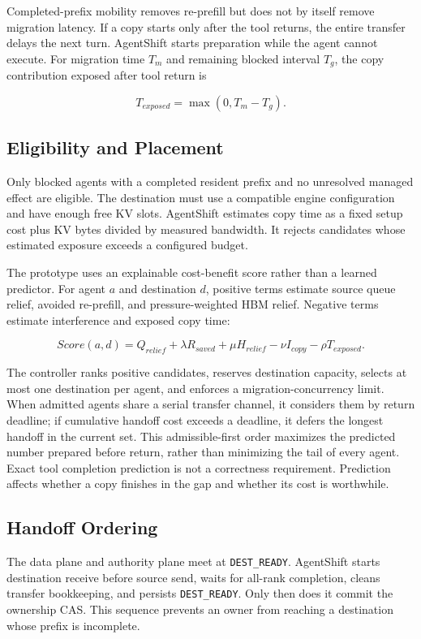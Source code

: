 Completed-prefix mobility removes re-prefill but does not by itself remove migration latency. If a copy starts only after the tool returns, the entire transfer delays the next turn. AgentShift starts preparation while the agent cannot execute. For migration time \(T_m\) and remaining blocked interval \(T_g\), the copy contribution exposed after tool return is

\[
T_{exposed}=\max(0,T_m-T_g).
\]

\subsection{Eligibility and Placement}\label{eligibility-and-placement}

Only blocked agents with a completed resident prefix and no unresolved managed effect are eligible. The destination must use a compatible engine configuration and have enough free KV slots. AgentShift estimates copy time as a fixed setup cost plus KV bytes divided by measured bandwidth. It rejects candidates whose estimated exposure exceeds a configured budget.

The prototype uses an explainable cost-benefit score rather than a learned predictor. For agent \(a\) and destination \(d\), positive terms estimate source queue relief, avoided re-prefill, and pressure-weighted HBM relief. Negative terms estimate interference and exposed copy time:

\[
Score(a,d)=Q_{relief}+\lambda R_{saved}+\mu H_{relief}
-\nu I_{copy}-\rho T_{exposed}.
\]

The controller ranks positive candidates, reserves destination capacity, selects at most one destination per agent, and enforces a migration-concurrency limit. When admitted agents share a serial transfer channel, it considers them by return deadline; if cumulative handoff cost exceeds a deadline, it defers the longest handoff in the current set. This admissible-first order maximizes the predicted number prepared before return, rather than minimizing the tail of every agent. Exact tool completion prediction is not a correctness requirement. Prediction affects whether a copy finishes in the gap and whether its cost is worthwhile.

\subsection{Handoff Ordering}\label{handoff-ordering}

The data plane and authority plane meet at \texttt{DEST\_READY}. AgentShift starts destination receive before source send, waits for all-rank completion, cleans transfer bookkeeping, and persists \texttt{DEST\_READY}. Only then does it commit the ownership CAS. This sequence prevents an owner from reaching a destination whose prefix is incomplete.

